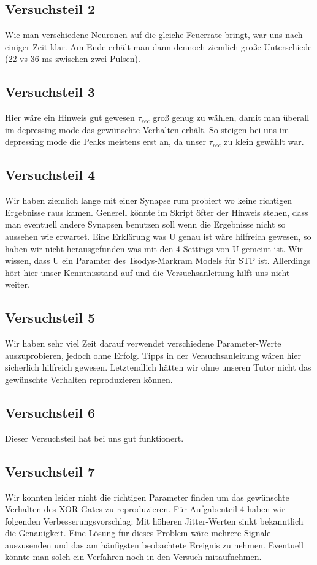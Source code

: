 \documentclass[10pt,a4paper]{scrartcl}
\begin{document}
\subsection*{Versuchsteil 2}
Wie man verschiedene Neuronen auf die gleiche Feuerrate bringt, war uns nach einiger Zeit klar. Am Ende erhält man dann dennoch ziemlich große Unterschiede (22 vs 36 ms zwischen zwei Pulsen).

\subsection*{Versuchsteil 3}
Hier wäre ein Hinweis gut gewesen $\tau_{rec}$ groß genug zu wählen, damit man überall im depressing mode das gewünschte Verhalten erhält. So steigen bei uns im depressing mode die Peaks meistens erst an, da unser $\tau_{rec}$ zu klein gewählt war.

\subsection*{Versuchsteil 4}
Wir haben ziemlich lange mit einer Synapse rum probiert wo keine richtigen Ergebnisse raus kamen. Generell könnte im Skript öfter der Hinweis stehen, dass man eventuell andere Synapsen benutzen soll wenn die Ergebnisse nicht so aussehen wie erwartet. Eine Erklärung was U genau ist wäre hilfreich gewesen, so haben wir nicht herausgefunden was mit den 4 Settings von U gemeint ist. Wir wissen, dass U ein Paramter des Tsodys-Markram Models für STP ist. Allerdings hört hier unser Kenntnisstand auf und die Versuchsanleitung hilft uns nicht weiter.

\subsection*{Versuchsteil 5}
Wir haben sehr viel Zeit darauf verwendet verschiedene Parameter-Werte auszuprobieren, jedoch ohne Erfolg. Tipps in der Versuchsanleitung wären hier sicherlich hilfreich gewesen. Letztendlich hätten wir ohne unseren Tutor nicht das gewünschte Verhalten reproduzieren können.

\subsection*{Versuchsteil 6}
Dieser Versuchsteil hat bei uns gut funktionert.

\subsection*{Versuchsteil 7}
Wir konnten leider nicht die richtigen Parameter finden um das gewünschte Verhalten des XOR-Gates zu reproduzieren. Für Aufgabenteil 4 haben wir folgenden Verbesserungsvorschlag: Mit höheren Jitter-Werten sinkt bekanntlich die Genauigkeit. Eine Lösung für dieses Problem wäre mehrere Signale auszusenden und das am häufigsten beobachtete Ereignis zu nehmen. Eventuell könnte man solch ein Verfahren noch in den Versuch mitaufnehmen.
\end{document}
